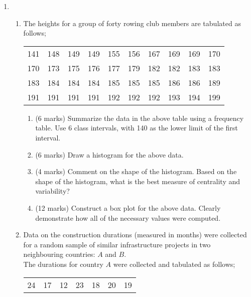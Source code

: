\documentclass[a4paper,12pt]{article}
\begin{document}
\begin{enumerate}
\item
\begin{enumerate}
\item The heights for a group of forty rowing club members are tabulated as follows;

    \begin{table}[ht]
\begin{center}
\begin{tabular}{|rrrrrrrrrr|}

  \hline
141 & 148 & 149 & 149 & 155 & 156 & 167 & 169 & 169 & 170 \\
170 & 173 & 175 & 176 & 177 & 179 & 182 & 182 & 183 & 183 \\
183 & 184 & 184 & 184 & 185 & 185 & 185 & 186 & 186 & 189 \\
191 & 191 & 191 & 191 & 192 & 192 & 192 & 193 & 194 & 199 \\
   \hline
\end{tabular}
\end{center}
\end{table}
\vspace{-0.5cm}
\begin{enumerate}
\item (6 marks) Summarize the data in the above table using a frequency table. Use 6 class intervals, with 140 as the lower limit of the first interval.
\item (6 marks) Draw a histogram for the above data.
\item (4 marks) Comment on the shape of the histogram. Based on the shape of the histogram, what is the best measure of centrality and variability?
\item (12 marks) Construct a box plot for the above data. Clearly demonstrate how all of the necessary values were computed.
\end{enumerate}
\vspace{0.25cm}
\item Data on the construction durations (measured in months) were collected for a random sample of similar infrastructure projects in two neighbouring countries: $A$ and $B$.\\
    The durations for country $A$ were collected and tabulated as follows;

\begin{table}[ht]
\begin{center}
\begin{tabular}{|rrrrrrr|}

\hline
24 & 17 & 12 & 23 & 18 & 20 & 19 \\


\end{tabular}
\end{center}
\end{table}
\end{enumerate}
\end{enumerate}
\end{document}
